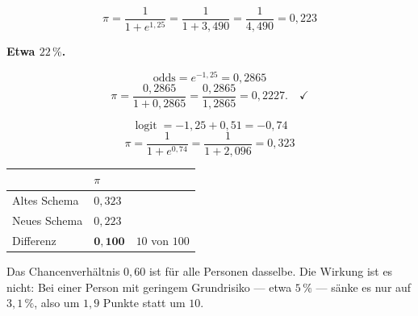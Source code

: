 \begin{aufgabe}
\[ \pi = \frac{1}{1+e^{1{,}25}} = \frac{1}{1+3{,}490} = \frac{1}{4{,}490} = 0{,}223 \]

\textbf{Etwa $22\,\%$.}

\[ \mathrm{odds} = e^{-1{,}25} = 0{,}2865 \]
\[ \pi = \frac{0{,}2865}{1+0{,}2865} = \frac{0{,}2865}{1{,}2865} = 0{,}2227 . \quad \checkmark \]

\[ \operatorname{logit} = -1{,}25 + 0{,}51 = -0{,}74 \]
\[ \pi = \frac{1}{1+e^{0{,}74}} = \frac{1}{1+2{,}096} = 0{,}323 \]

\begin{center}
\renewcommand{\arraystretch}{1.48}
\begin{tabular}{@{}P{2.8cm}P{2.0cm}P{2.6cm}@{}}
\toprule
& $\pi$ & \\
\midrule
Altes Schema & $0{,}323$ & \\
Neues Schema & $0{,}223$ & \\
\midrule
Differenz & $\mathbf{0{,}100}$ & $10$ von $100$\\
\bottomrule
\end{tabular}
\end{center}

Das Chancenverhältnis $0{,}60$ ist für alle Personen dasselbe. Die  Wirkung ist es nicht: Bei einer Person mit geringem Grundrisiko --- etwa $5\,\%$ --- sänke es nur auf $3{,}1\,\%$, also um $1{,}9$ Punkte statt um $10$.

\begin{center}
\begin{minipage}{0.86\textwidth}
\end{minipage}
\end{center}
\end{aufgabe}

